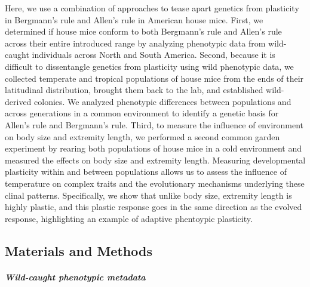 \documentclass[]{article}
\let\oldsubparagraph\subparagraph
\renewcommand{\subparagraph}[1]{\oldsubparagraph{#1}\mbox{}}
\begin{document}
Here, we use a combination of approaches to tease apart genetics from
plasticity in Bergmann's rule and Allen's rule in American house mice.
First, we determined if house mice conform to both Bergmann's rule and
Allen's rule across their entire introduced range by analyzing
phenotypic data from wild-caught individuals across North and South
America. Second, because it is difficult to dissentangle genetics from
plasticity using wild phenotypic data, we collected temperate and
tropical populations of house mice from the ends of their latitudinal
distribution, brought them back to the lab, and established wild-derived
colonies. We analyzed phenotypic differences between populations and
across generations in a common environment to identify a genetic basis
for Allen's rule and Bergmann's rule. Third, to measure the influence of
environment on body size and extremity length, we performed a second
common garden experiment by rearing both populations of house mice in a
cold environment and measured the effects on body size and extremity
length. Measuring developmental plasticity within and between
populations allows us to assess the influence of temperature on complex
traits and the evolutionary mechanisms underlying these clinal patterns.
Specifically, we show that unlike body size, extremity length is highly
plastic, and this plastic response goes in the same direction as the
evolved response, highlighting an example of adaptive phentoypic
plasticity.

\vspace{5mm}

\hypertarget{materials-and-methods}{%
\subsection{Materials and Methods}\label{materials-and-methods}}

\hypertarget{wild-caught-phenotypic-metadata}{%
\subparagraph{\texorpdfstring{\emph{Wild-caught phenotypic
metadata}}{Wild-caught phenotypic metadata}}\label{wild-caught-phenotypic-metadata}}
\end{document}
